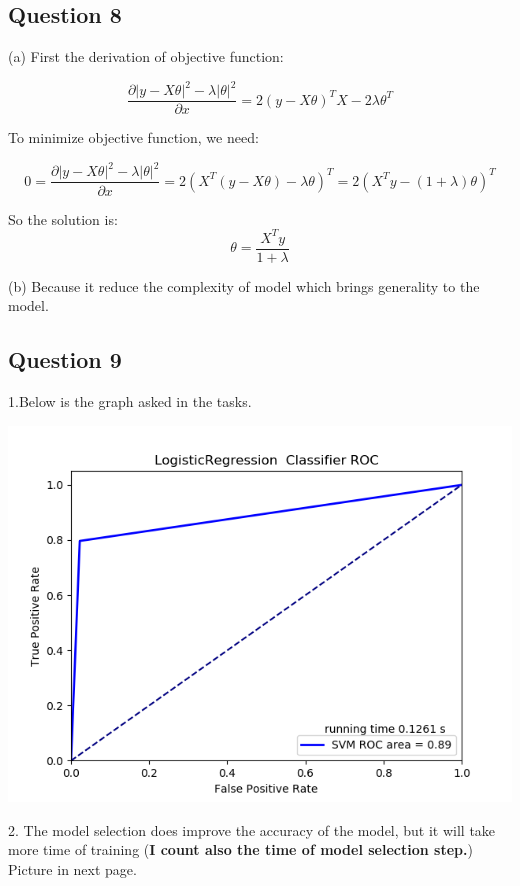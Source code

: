 \documentclass{article}
\begin{document}
\subsection{Question 8}

(a) First the derivation of objective function:

\begin{equation*}
	\frac{\partial |y-X\theta|^2-\lambda|\theta|^2}{\partial x}=2\left(y-X\theta\right)^T X-2\lambda \theta^T
\end{equation*}

To minimize objective function, we need:

\begin{equation*}
	0=\frac{\partial |y-X\theta|^2-\lambda|\theta|^2}{\partial x}=2\left(X^T\left(y-X\theta\right)-\lambda \theta\right)^T=2\left(X^Ty- (1+\lambda) \theta\right)^T
\end{equation*}

So the solution is:
$$\theta=\frac{X^Ty}{1+\lambda}$$

(b) Because it reduce the complexity of model which brings generality to the model.

\newpage
\subsection{Question 9}
1.Below is the graph asked in the tasks. 

\includegraphics{MA2823MLAssignment_1/MA2823-ML-Assignment_1/Roc_Curve}

2. The model selection does improve the accuracy of the model, but it will take more time of training (\textbf{I count also the time of model selection step.}) Picture in next page.
\end{document}
